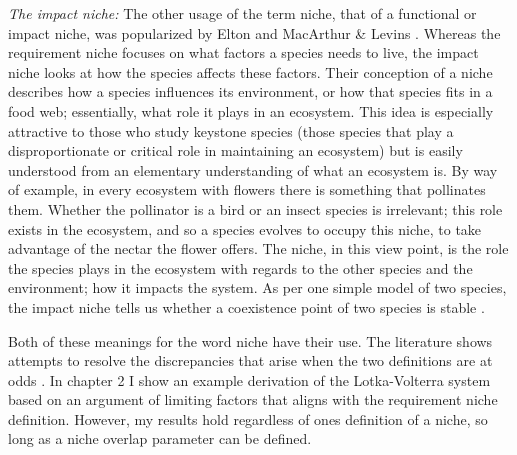 \emph{The impact niche:}
The other usage of the term niche, that of a functional or impact niche, was popularized by Elton \cite{Elton1927} and MacArthur \& Levins \cite{MacArthur1967}. 
Whereas the requirement niche focuses on what factors a species needs to live, the impact niche looks at how the species affects these factors. 
Their conception of a niche describes how a species influences its environment, or how that species fits in a food web; essentially, what role it plays in an ecosystem. 
This idea is especially attractive to those who study keystone species (those species that play a disproportionate or critical role in maintaining an ecosystem) \cite{May1999,Chesson2000,Leibold2006} but is easily understood from an elementary understanding of what an ecosystem is. 
By way of example, in every ecosystem with flowers there is something that pollinates them. 
Whether the pollinator is a bird or an insect species is irrelevant; this role exists in the ecosystem, and so a species evolves to occupy this niche, to take advantage of the nectar the flower offers. 
The niche, in this view point, is the role the species plays in the ecosystem with regards to the other species and the environment; how it impacts the system. 
As per one simple model of two species, the impact niche tells us whether a coexistence point of two species is stable \cite{Tilman1982textbook}. 

Both of these meanings for the word niche have their use.
The literature shows attempts to resolve the discrepancies that arise when the two definitions are at odds \cite{Leibold1995,Leibold2006}. 
In chapter 2 I show an example derivation of the Lotka-Volterra system based on an argument of limiting factors that aligns with the requirement niche definition. 
However, my results hold regardless of ones definition of a niche, so long as a niche overlap parameter can be defined. 

